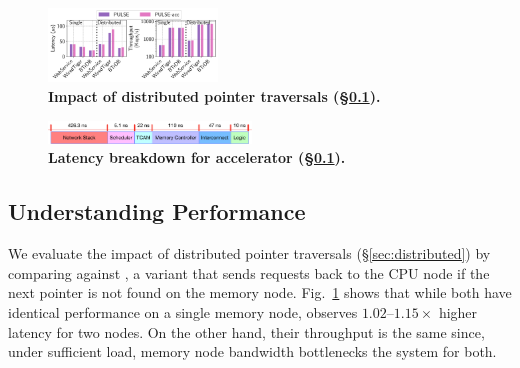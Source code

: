 \begin{figure}[t]
\centering
\includegraphics[width=0.4\textwidth]{fig/pulse/breakdown.pdf}%
\vspace{-1em}
\caption[Impact of distributed pointer traversals]{\textbf{Impact of distributed pointer traversals (\S\ref{ssec:breakdown}).}}
\label{fig:eval_breakdown}
\end{figure}

\begin{figure}[t]
  \centering	
  \includegraphics[width=0.48\textwidth]{fig/pulse/breakdown_latency_new.pdf}
  \vspace{-1em}
  \caption[Latency breakdown for \pulse accelerator ]{\textbf{Latency breakdown for \pulse accelerator (\S\ref{ssec:breakdown}).}}
  \label{fig:eval_breakdown_latency_}%
\end{figure}




\subsection{Understanding \pulse Performance}
\label{ssec:breakdown}




 We evaluate the impact of distributed pointer traversals (\S\ref{sec:distributed}) by comparing \pulse against \pulseacc, a \pulse variant that sends requests back to the CPU node if the next pointer is not found on the memory node. Fig.~\ref{fig:eval_breakdown} shows that while both have identical performance on a single memory node, \pulseacc observes $1.02$--$1.15\times$ higher latency for two nodes. On the other hand, their throughput is the same since, under sufficient load, memory node bandwidth bottlenecks the system for both.





